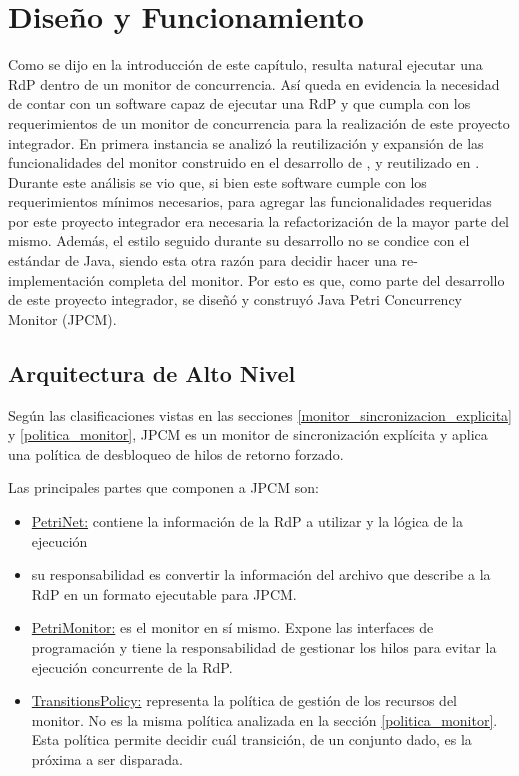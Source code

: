 \section{Diseño y Funcionamiento}

Como se dijo en la introducción de este capítulo, resulta natural ejecutar
una RdP dentro de un monitor de concurrencia. Así queda en evidencia la
necesidad de contar con un software capaz de ejecutar una RdP y que cumpla con
los requerimientos de un monitor de concurrencia para la realización de este
proyecto integrador.
En primera instancia se analizó la reutilización y expansión de las
funcionalidades del monitor construido en el desarrollo de \cite{codegen}, y
reutilizado en \cite{chimp}. Durante este análisis se vio que, si bien este
software cumple con los requerimientos mínimos necesarios, para agregar las
funcionalidades requeridas por este proyecto integrador era necesaria la
refactorización de la mayor parte del mismo. Además, el estilo seguido durante
su desarrollo no se condice con el estándar de Java, siendo esta otra razón
para decidir hacer una re-implementación completa del monitor.
Por esto es que, como parte del desarrollo de este proyecto integrador, se
diseñó y construyó Java Petri Concurrency Monitor (JPCM).

\subsection{Arquitectura de Alto Nivel}
\label{JPCM_arq_alto_nivel}

Según las clasificaciones vistas en las secciones
\ref{monitor_sincronizacion_explicita} y \ref{politica_monitor}, JPCM es un
monitor de sincronización explícita y aplica una política de desbloqueo de hilos
de retorno forzado.
 
Las principales partes que componen a JPCM son:
\begin{itemize}
  \item \underline{PetriNet:} contiene la información de la RdP a utilizar y la
  lógica de la ejecución
  \item {} su responsabilidad es
  convertir la información del archivo que describe a la RdP en un formato
  ejecutable para JPCM.
  \item \underline{PetriMonitor:} es el monitor en sí mismo. Expone las
  interfaces de programación y tiene la responsabilidad de gestionar los hilos
  para evitar la ejecución concurrente de la RdP.
  \item \underline{TransitionsPolicy:} representa la política de gestión de los
  recursos del monitor. No es la misma política analizada en la sección
  \ref{politica_monitor}. Esta política permite decidir cuál transición, de un
  conjunto dado, es la próxima a ser disparada.
\end{itemize}

